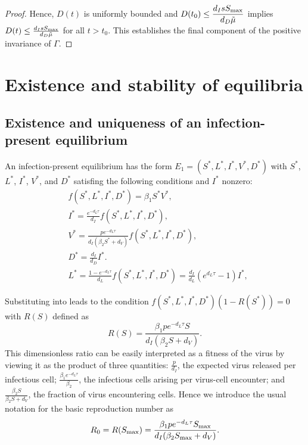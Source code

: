 \documentclass{CMHPhD-SIVD}
\begin{document}
\begin{proof}
Hence, $D(t)$ is uniformly bounded and $D(t_0)\leq \dfrac{ d_I s S_{\text{max}}}{d_D\tilde{\mu}}$ implies $D(t)\leq \frac{d_I s S_{\text{max}}}{d_D\tilde{\mu}}$ for all $t>t_0$. This establishes the final component of the positive invariance of $\Gamma$.


\end{proof}

\section{Existence and stability of equilibria}

\subsection{Existence and uniqueness of an infection-present equilibrium}\label{sec3.1}
An infection-present equilibrium has the form $E_1 = (S^*,L^*,I^*,V^*,D^*)$ with $S^*$, $L^*$, $I^*$, $V^*$, and $D^*$ satisfing the following conditions and $I^*$ nonzero:
\begin{subequations}
\begin{align}
&f(S^*, L^*, I^*, D^*)=\beta_1 S^* V^*, \label{S1}\\
&I^*=\frac{e^{-d_L\tau}}{d_I}f(S^*, L^*, I^*, D^*), \label{I1}\\
&V^*=\frac{p e^{-d_L\tau}}{d_I(\beta_2 S^*+d_V)}f(S^*, L^*, I^*, D^*),\label{V1}\\
&D^*=\frac{d_I}{d_D}I^*. \label{D1} \\%
&L^*=\frac{1-e^{-d_L\tau}}{d_L}f(S^*, L^*, I^*, D^*) = \frac{d_I}{d_L}(e^{d_L\tau}-1)I^*, \label{L1}
\end{align}
\end{subequations}

Substituting  into  leads to the condition
	$f(S^*, L^*, I^*, D^*)\left(1 - R(S^*)\right) = 0$
with $R(S)$ defined as
\begin{equation}
	R(S) = \frac{\beta_1 p e^{-d_L\tau} S}{d_I(\beta_2 S+d_V)}.
\end{equation}
This dimensionless ratio can be easily interpreted as a fitness of the virus by viewing it as the product of three quantities:  $\frac{p}{d_I}$, the expected virus released per infectious cell; $\frac{\beta_1e^{-d_L\tau}}{\beta_2}$, the infectious cells arising per virus-cell encounter; and $\frac{\beta_2 S}{\beta_2S+d_V}$, the fraction of virus encountering cells.  Hence we introduce the usual notation for the basic reproduction number as
\begin{equation}
	R_0 = R(S_{\text{max}})
	= \frac{\beta_1 p e^{-d_L\tau} S_{\text{max}}}{d_I(\beta_2 S_{\text{max}}+d_V)}.
\end{equation}
\end{document}
